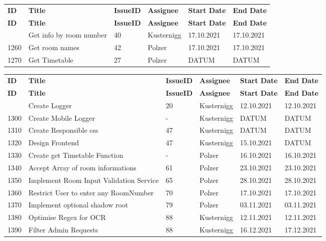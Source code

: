 
\begin{longtable}{|p{}|p{}|p{}|p{}|p{}|p{}|} \hline
    \textbf{ID} & \textbf{Title} & \textbf{Issue\-ID} & \textbf{Assignee} & \textbf{Start Date} & \textbf{End\- Date} \\ \hhline{|=|=|=|=|=|=|}
    \endfirsthead
    \hline
    \textbf{ID} & \textbf{Title} & \textbf{Issue\-ID} & \textbf{Assignee} & \textbf{Start Date} & \textbf{End\- Date} \\ \hhline{|=|=|=|=|=|=|}
    \endhead
    1180 & Get info by room number & 40 & Kusternigg & 17.10.2021 & 17.10.2021 \\ \hline
    1260 & Get room names & 42 & Polzer & 17.10.2021 & 17.10.2021 \\ \hline
    1270 & Get Timetable & 27 & Polzer & DATUM & DATUM \\ \hline
\end{longtable}

\pagebreak
{}
\begin{longtable}{|p{}|p{}|p{}|p{}|p{}|p{}|} \hline
    \textbf{ID} & \textbf{Title} & \textbf{Issue\-ID} & \textbf{Assignee} & \textbf{Start Date} & \textbf{End\- Date} \\ \hhline{|=|=|=|=|=|=|}
    \endfirsthead
    \hline
    \textbf{ID} & \textbf{Title} & \textbf{Issue\-ID} & \textbf{Assignee} & \textbf{Start Date} & \textbf{End\- Date} \\ \hhline{|=|=|=|=|=|=|}
    \endhead
    1280 & Create Logger & 20 & Kusternigg & 12.10.2021 & 12.10.2021 \\ \hline
    1300 & Create Mobile Logger & - & Kusternigg & DATUM & DATUM \\ \hline
    1310 & Create Responsible css & 47 & Kusternigg & DATUM & DATUM \\ \hline
    1320 & Design Frontend & 47 & Kusternigg & 15.10.2021 & DATUM \\ \hline
    1330 & Create get Timetable Function & - & Polzer & 16.10.2021 & 16.10.2021 \\ \hline
    1340 & Accept Array of room informations & 61 & Polzer & 23.10.2021 & 23.10.2021 \\ \hline
    1350 & Implement Room Input Validation Service & 65 & Polzer & 28.10.2021 & 28.10.2021 \\ \hline
    1360 & Restrict User to enter any RoomNumber & 70 & Polzer & 17.10.2021 & 17.10.2021 \\ \hline
    1370 & Implement optional shadow root & 79  & Polzer & 03.11.2021 & 03.11.2021 \\ \hline
    1380 & Optimise Regex for OCR & 88  & Kusternigg & 12.11.2021 & 12.11.2021 \\ \hline
    1390 & Filter Admin Requests & 88  & Kusternigg & 16.12.2021 & 17.12.2021 \\ \hline
\end{longtable}

